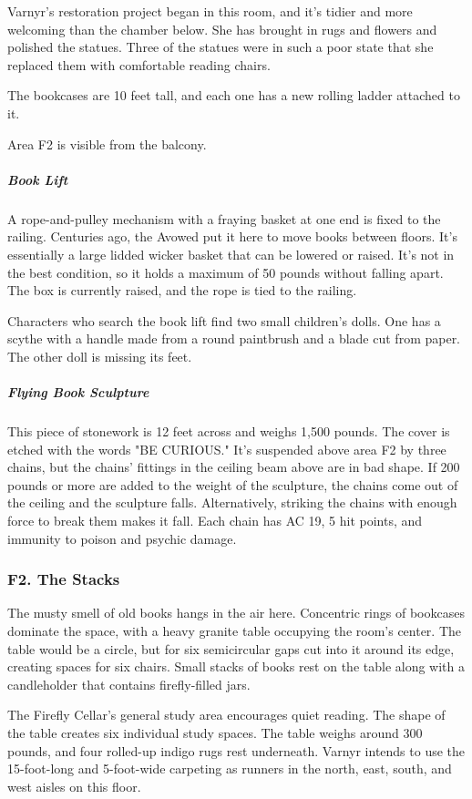 \documentclass[10pt,a4paper,twoside,bg=print,twocolumn,openany,nodeprecatedcode]{dndbook}
\begin{document}
Varnyr's restoration project began in this room, and it's tidier and more welcoming than the chamber below. She has brought in rugs and flowers and polished the statues. Three of the statues were in such a poor state that she replaced them with comfortable reading chairs.

The bookcases are 10 feet tall, and each one has a new rolling ladder attached to it.

Area F2 is visible from the balcony.

\subparagraph{Book Lift}
A rope-and-pulley mechanism with a fraying basket at one end is fixed to the railing. Centuries ago, the Avowed put it here to move books between floors. It's essentially a large lidded wicker basket that can be lowered or raised. It's not in the best condition, so it holds a maximum of 50 pounds without falling apart. The box is currently raised, and the rope is tied to the railing.

Characters who search the book lift find two small children's dolls. One has a scythe with a handle made from a round paintbrush and a blade cut from paper. The other doll is missing its feet.

\subparagraph{Flying Book Sculpture}
This piece of stonework is 12 feet across and weighs 1,500 pounds. The cover is etched with the words "BE CURIOUS." It's suspended above area F2 by three chains, but the chains' fittings in the ceiling beam above are in bad shape. If 200 pounds or more are added to the weight of the sculpture, the chains come out of the ceiling and the sculpture falls. Alternatively, striking the chains with enough force to break them makes it fall. Each chain has AC 19, 5 hit points, and immunity to poison and psychic damage.

\subsubsection{F2. The Stacks}
\begin{DndReadAloud}{}
The musty smell of old books hangs in the air here. Concentric rings of bookcases dominate the space, with a heavy granite table occupying the room's center. The table would be a circle, but for six semicircular gaps cut into it around its edge, creating spaces for six chairs. Small stacks of books rest on the table along with a candleholder that contains firefly-filled jars.

\end{DndReadAloud}

The Firefly Cellar's general study area encourages quiet reading. The shape of the table creates six individual study spaces. The table weighs around 300 pounds, and four rolled-up indigo rugs rest underneath. Varnyr intends to use the 15-foot-long and 5-foot-wide carpeting as runners in the north, east, south, and west aisles on this floor.
\end{document}
